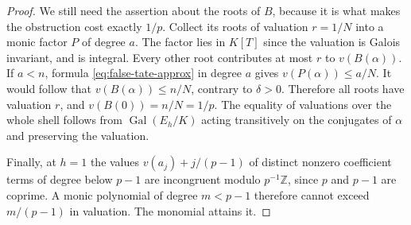 \begin{proof}
We still need the assertion about the roots of $B$, because it is
what makes the obstruction cost exactly $1/p$. Collect its roots of
valuation $r=1/N$ into a monic factor $P$ of degree $a$. The factor
lies in $K[T]$ since the valuation is Galois invariant, and is integral.
Every other root contributes at most $r$ to $v(B(\alpha))$.
If $a<n$, formula \eqref{eq:false-tate-approx} in degree $a$ gives
$v(P(\alpha))\le a/N$. It would follow that
$v(B(\alpha))\le n/N$, contrary to $\delta>0$.
Therefore all roots have valuation $r$, and $v(B(0))=n/N=1/p$.
The equality of valuations over the whole shell follows from
$\operatorname{Gal}(E_h/K)$ acting transitively on the conjugates of
$\alpha$ and preserving the valuation.

Finally, at $h=1$ the values $v(a_j)+j/(p-1)$ of distinct nonzero
coefficient terms of degree below $p-1$ are incongruent modulo
$p^{-1}\mathbb Z$, since $p$ and $p-1$ are coprime. A monic polynomial
of degree $m<p-1$ therefore cannot exceed $m/(p-1)$ in valuation.
The monomial attains it.
\end{proof}

